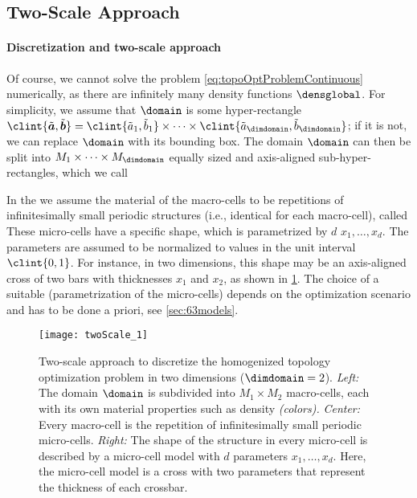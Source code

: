 \subsection{Two-Scale Approach}
\label{sec:612twoScale}

\paragraph{Discretization and two-scale approach}

Of course, we cannot solve the problem \eqref{eq:topoOptProblemContinuous}
numerically,
as there are infinitely many density functions $\densglobal$.
For simplicity, we assume that $\domain$ is some hyper-rectangle
$\clint{\tilde{\*a}, \tilde{\*b}}
= \clint{\tilde{a}_1, \tilde{b}_1} \times \dotsb \times
\clint{\tilde{a}_{\dimdomain}, \tilde{b}_{\dimdomain}}$;
if it is not, we can replace $\domain$ with its bounding box.
The domain $\domain$ can then be split into
$M_1 \times \dotsb \times M_{\dimdomain}$
equally sized and axis-aligned sub-hyper-rectangles,
which we call 

In the 
we assume the material of the macro-cells to be
repetitions of infinitesimally small periodic structures
(i.e., identical for each macro-cell),
called 
These micro-cells have a specific shape, which is parametrized by
$d$  $x_1, \dotsc, x_d$.
The parameters are assumed to be normalized to values in the
unit interval $\clint{0, 1}$.
For instance, in two dimensions,
this shape may be an axis-aligned cross of two bars
with thicknesses $x_1$ and $x_2$, as shown in \cref{fig:twoScale}.
The choice of a suitable 
(parametrization of the micro-cells)
depends on the optimization scenario and has to be done a priori,
see \cref{sec:63models}.

\begin{figure}
  \texttt{[image: twoScale\_1]}%
  \caption[%
    Two-scale approach for topology optimization%
  ]{%
    Two-scale approach to discretize the homogenized topology
    optimization problem in two dimensions ($\dimdomain = 2$).
    \emph{Left:} The domain $\domain$ is subdivided into $M_1 \times M_2$
    macro-cells, each with its own material properties such as density
    \emph{(colors).}
    \emph{Center:} Every macro-cell is the repetition of infinitesimally small
    periodic micro-cells.
    \emph{Right:} The shape of the structure in every micro-cell is
    described by a micro-cell model with $d$ parameters $x_1, \dotsc, x_d$.
    Here, the micro-cell model is a cross with two parameters
    that represent the thickness of each crossbar.%
  }%
  \label{fig:twoScale}%
\end{figure}

